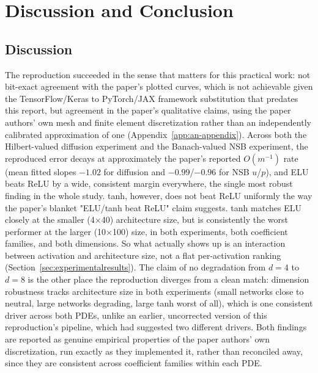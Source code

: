 \cleardoubleoddpage%
\chapter{Discussion and Conclusion}
\label{sec:conclusion}

\section{Discussion}

The reproduction succeeded in the sense that matters for this practical
work: not bit-exact agreement with the paper's plotted curves, which is not
achievable given the TensorFlow/Keras to PyTorch/JAX framework
substitution that predates this report, but agreement in the paper's
qualitative claims, using the paper authors' own mesh and finite element
discretization rather than an independently calibrated approximation of
one (Appendix~\ref{app:an-appendix}). Across both the Hilbert-valued
diffusion experiment and the Banach-valued NSB experiment, the reproduced
error decays at approximately the paper's reported $O(m^{-1})$ rate (mean
fitted slopes $-1.02$ for diffusion and $-0.99$/$-0.96$ for NSB $u$/$p$),
and ELU beats ReLU by a wide, consistent margin everywhere, the single
most robust finding in the whole study. tanh, however, does not beat ReLU
uniformly the way the paper's blanket "ELU/tanh beat ReLU" claim suggests.
tanh matches ELU closely at the smaller (4$\times$40) architecture size,
but is consistently the worst performer at the larger (10$\times$100)
size, in both experiments, both coefficient families, and both
dimensions. So what actually shows up is an interaction between activation
and architecture size, not a flat per-activation ranking
(Section~\ref{sec:experimentalresults}). The claim of no degradation from
$d=4$ to $d=8$ is the other place the reproduction diverges from a clean
match: dimension robustness tracks architecture size in both experiments
(small networks close to neutral, large networks degrading, large tanh
worst of all), which is one consistent driver across both PDEs, unlike an
earlier, uncorrected version of this reproduction's pipeline, which had
suggested two different drivers. Both findings are reported as genuine
empirical properties of the paper authors' own discretization, run
exactly as they implemented it, rather than reconciled away, since they
are consistent across coefficient families within each PDE.

